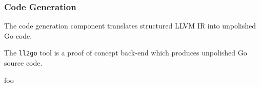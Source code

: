 
\subsubsection{Code Generation}
\label{sec:design_code_generation}


The code generation component translates structured LLVM IR into unpolished Go code.

The \texttt{ll2go} tool is a proof of concept back-end which produces unpolished Go source code.


foo
